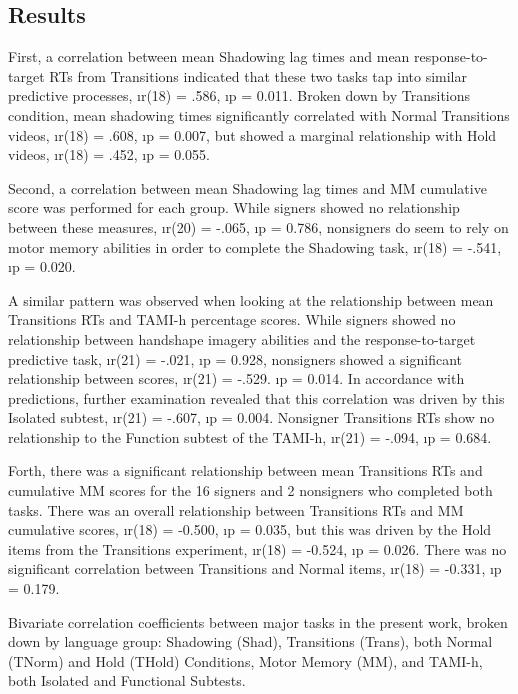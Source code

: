     \subsection{Results}
            First, a correlation between mean Shadowing lag times and mean response-to-target RTs from Transitions indicated that these two tasks tap into similar predictive processes, \i{r}(18) = .586, \i{p} = 0.011. Broken down by Transitions condition, mean shadowing times significantly correlated with Normal Transitions videos, \i{r}(18) = .608, \i{p} = 0.007, but showed a marginal relationship with Hold videos, \i{r}(18) = .452, \i{p} = 0.055. \par
            Second, a correlation between mean Shadowing lag times and MM cumulative score was performed for each group. While signers showed no relationship between these measures, \i{r}(20) = -.065, \i{p} = 0.786, nonsigners do seem to rely on motor memory abilities in order to complete the Shadowing task, \i{r}(18) = -.541, \i{p} = 0.020. \par
            A similar pattern was observed when looking at the relationship between mean Transitions RTs and TAMI-h percentage scores. While signers showed no relationship between handshape imagery abilities and the response-to-target predictive task, \i{r}(21) = -.021, \i{p} = 0.928, nonsigners showed a significant relationship between scores, \i{r}(21) = -.529. \i{p} = 0.014. In accordance with predictions, further examination revealed that this correlation was driven by this Isolated subtest, \i{r}(21) = -.607, \i{p} = 0.004. Nonsigner Transitions RTs show no relationship to the Function subtest of the TAMI-h, \i{r}(21) = -.094, \i{p} = 0.684. \par
            Forth, there was a significant relationship between mean Transitions RTs and cumulative MM scores for the 16 signers and 2 nonsigners who completed both tasks. There was an overall relationship between Transitions RTs and MM cumulative scores, \i{r}(18) = -0.500, \i{p} = 0.035, but this was driven by the Hold items from the Transitions experiment, \i{r}(18) = -0.524, \i{p} = 0.026. There was no significant correlation between Transitions and Normal items, \i{r}(18) = -0.331, \i{p} = 0.179.

            \begin{table}[!h]\centering \begin{threeparttable} 
            \caption[Inter-experimental correlation coefficients]{Bivariate correlation coefficients between major tasks in the present work, broken down by language group: Shadowing (Shad), Transitions (Trans), both Normal (TNorm) and Hold (THold) Conditions, Motor Memory (MM), and TAMI-h, both Isolated and Functional Subtests.} \label{tab:correl}
            
            \end{threeparttable} \end{table}

